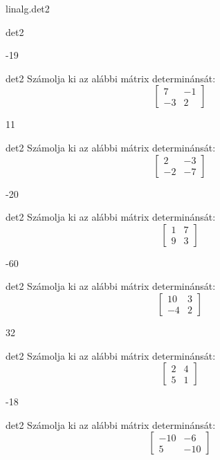 \documentclass[12pt]{article}
\begin{document}
\begin{quiz}{linalg.det2}
\begin{numerical}{det2}
\item -19
\end{numerical}


\begin{numerical}{det2}
Számolja ki az alábbi mátrix determinánsát:
$$\left[\begin{array}{cc}7& -1\\ -3& 2\end{array}\right]$$

\item 11
\end{numerical}


\begin{numerical}{det2}
Számolja ki az alábbi mátrix determinánsát:
$$\left[\begin{array}{cc}2& -3\\ -2& -7\end{array}\right]$$

\item -20
\end{numerical}


\begin{numerical}{det2}
Számolja ki az alábbi mátrix determinánsát:
$$\left[\begin{array}{cc}1& 7\\ 9& 3\end{array}\right]$$

\item -60
\end{numerical}


\begin{numerical}{det2}
Számolja ki az alábbi mátrix determinánsát:
$$\left[\begin{array}{cc}10& 3\\ -4& 2\end{array}\right]$$

\item 32
\end{numerical}


\begin{numerical}{det2}
Számolja ki az alábbi mátrix determinánsát:
$$\left[\begin{array}{cc}2& 4\\ 5& 1\end{array}\right]$$

\item -18
\end{numerical}


\begin{numerical}{det2}
Számolja ki az alábbi mátrix determinánsát:
$$\left[\begin{array}{cc}-10& -6\\ 5& -10\end{array}\right]$$


\end{numerical}
\end{quiz}
\end{document}
